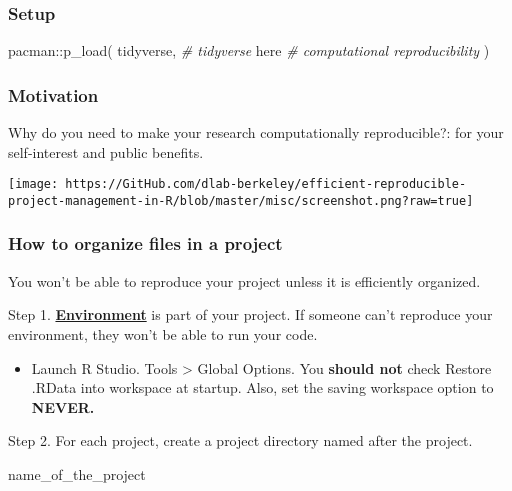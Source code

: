 \documentclass[
]{book}
\newenvironment{Shaded}{\begin{snugshade}}{\end{snugshade}}
\newcommand{\CommentTok}[1]{\textcolor[rgb]{0.56,0.35,0.01}{\textit{#1}}}
\newcommand{\FunctionTok}[1]{\textcolor[rgb]{0.00,0.00,0.00}{#1}}
\newcommand{\NormalTok}[1]{#1}
\newcommand{\SpecialCharTok}[1]{\textcolor[rgb]{0.00,0.00,0.00}{#1}}
\providecommand{\tightlist}{%
  \setlength{\itemsep}{0pt}\setlength{\parskip}{0pt}}
\begin{document}
\hypertarget{setup-1}{%
\subsubsection{Setup}\label{setup-1}}

\begin{Shaded}
\begin{Highlighting}[]
\NormalTok{pacman}\SpecialCharTok{::}\FunctionTok{p\_load}\NormalTok{(}
\NormalTok{  tidyverse, }\CommentTok{\# tidyverse}
\NormalTok{  here }\CommentTok{\# computational reproducibility}
\NormalTok{)}
\end{Highlighting}
\end{Shaded}

\hypertarget{motivation-1}{%
\subsubsection{Motivation}\label{motivation-1}}

Why do you need to make your research computationally reproducible?: for your self-interest and public benefits.

\texttt{[image: https://GitHub.com/dlab-berkeley/efficient-reproducible-project-management-in-R/blob/master/misc/screenshot.png?raw=true]}

\hypertarget{how-to-organize-files-in-a-project}{%
\subsubsection{How to organize files in a project}\label{how-to-organize-files-in-a-project}}

You won't be able to reproduce your project unless it is efficiently organized.

Step 1. \href{https://environments.rstudio.com/}{\textbf{Environment}} is part of your project. If someone can't reproduce your environment, they won't be able to run your code.

\begin{itemize}
\tightlist
\item
  Launch R Studio. Tools \textgreater{} Global Options. You \textbf{should not} check Restore .RData into workspace at startup. Also, set the saving workspace option to \textbf{NEVER.}
\end{itemize}

Step 2. For each project, create a project directory named after the project.

name\_of\_the\_project
\end{document}
